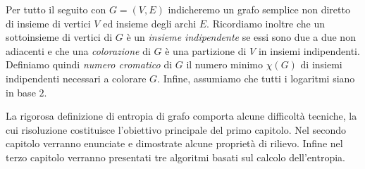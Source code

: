 Per tutto il seguito con $G=(V,E)$ indicheremo un grafo semplice non diretto di insieme di vertici $V$ ed insieme degli archi $E$. Ricordiamo inoltre che un sottoinsieme di vertici di $G$ è un \emph{insieme indipendente} se essi sono due a due non adiacenti e che una \emph{colorazione} di $G$ è una partizione di $V$ in insiemi indipendenti. Definiamo quindi \emph{numero cromatico} di $G$ il numero minimo $\chi(G)$ di insiemi indipendenti necessari a colorare $G$. Infine, assumiamo che tutti i logaritmi siano in base $2$.

La rigorosa definizione di entropia di grafo comporta alcune difficoltà tecniche, la cui risoluzione costituisce l'obiettivo principale del primo capitolo. Nel secondo capitolo verranno enunciate e dimostrate alcune proprietà di rilievo. Infine nel terzo capitolo verranno presentati tre algoritmi basati sul calcolo dell'entropia. 
